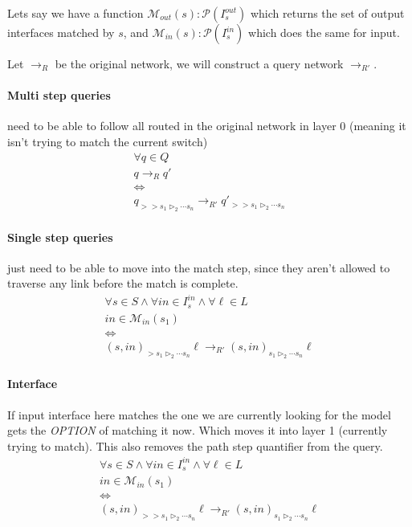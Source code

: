 \documentclass[preview]{standalone}
\begin{document}
Lets say we have a function $\mathcal{M}_{out}(s)
: \mathcal{P}(I^{out}_s)$ which returns the set of output interfaces
matched by $s$, and $\mathcal{M}_{in}(s) : \mathcal{P}(I^{in}_s)$
which does the same for input.

Let $\to_R$ be the original network, we will construct a query network
$\to_{R'}$.

\paragraph{Multi step queries} need to be able to follow all routed in
the original network in layer 0 (meaning it isn't trying to match the
current switch)
\begin{gather*}
	\forall q \in Q \\
	q \to_R q' \\
	\iff \\
	q_{>> s_1 \triangleright_2 \dotsb s_n} \to_{R'}
		q'_{>> s_1 \triangleright_2 \dotsb s_n}
\end{gather*}
\paragraph{Single step queries} just need to be able to move into the
match step, since they aren't allowed to traverse any link before the
match is complete.
\begin{gather*}
	\forall s \in S \wedge \forall in \in I^{in}_s \wedge \forall \ell \in L \\
	in \in \mathcal{M}_{in}(s_1) \\
	\iff \\
	{(s, in)}_{> s_1 \triangleright_2 \dotsb s_n}\ell \to_{R'}
		{(s, in)}_{s_1 \triangleright_2 \dotsb s_n}\ell
\end{gather*}
\paragraph{Interface} If input interface here matches the one we are
currently looking for the model gets the \emph{OPTION} of matching it
now. Which moves it into layer 1 (currently trying to match). This also
removes the path step quantifier from the query.
\begin{gather*}
	\forall s \in S \wedge \forall in \in I^{in}_s \wedge \forall \ell \in L \\
	in \in \mathcal{M}_{in}(s_1) \\
	\iff \\
	{(s, in)}_{>> s_1 \triangleright_2 \dotsb s_n}\ell \to_{R'}
		{(s, in)}_{s_1 \triangleright_2 \dotsb s_n}\ell
\end{gather*}
\end{document}
